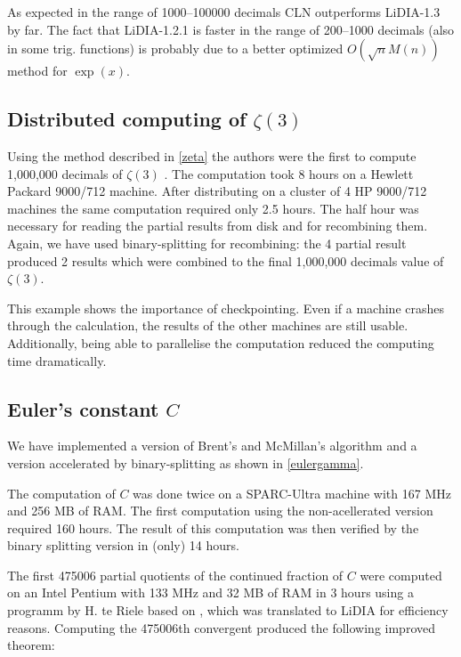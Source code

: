 As expected in the range of 1000--100000 decimals CLN outperforms
{\sf LiDIA-1.3} by far. The fact that {\sf LiDIA-1.2.1} is faster
in the range of 200--1000 decimals (also in some trig. functions)
is probably due to a better optimized \( O(\sqrt{n}M(n)) \) method
for \( \exp(x) \).

\subsection {Distributed computing of \( \zeta (3) \)}

Using the method described in \ref{zeta} the authors were the first to 
compute 1,000,000 decimals of \( \zeta (3) \) \cite{96d}.
The computation took 8 hours on a Hewlett Packard 9000/712 machine. After
distributing on a cluster of 4 HP 9000/712 machines the same computation
required only 2.5 hours. The half hour was necessary for reading the partial
results from disk and for recombining them. Again, we have used binary-splitting
for recombining: the 4 partial result produced 2 results which were combined
to the final 1,000,000 decimals value of \( \zeta (3) \).

This example shows the importance of checkpointing. Even if a machine crashes
through the calculation, the results of the other machines are still usable.
Additionally, being able to parallelise the computation reduced the computing
time dramatically.

\subsection{Euler's constant \( C \)}

We have implemented a version of Brent's and McMillan's algorithm \cite{80} and
a version accelerated by binary-splitting as shown in \ref{eulergamma}.

The computation of \( C \) was done twice on a SPARC-Ultra machine
with 167 MHz and 256 MB of RAM. The first computation using the non-acellerated
version required 160 hours. The result of this computation was then verified
by the binary splitting version in (only) 14 hours.

The first 475006 partial quotients of the continued fraction of \( C \)
were computed on an Intel Pentium with 133 MHz and 32 MB of RAM in 3 hours
using a programm by H. te Riele based on \cite{96e}, which was translated to
{\sf LiDIA} for efficiency reasons. Computing the 475006th
convergent produced the following improved theorem:

